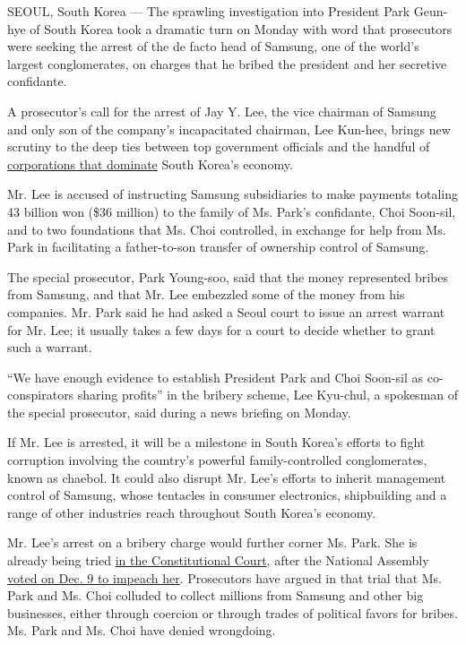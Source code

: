 SEOUL, South Korea --- The sprawling investigation into President Park
Geun-hye of South Korea took a dramatic turn on Monday with word that
prosecutors were seeking the arrest of the de facto head of Samsung, one
of the world's largest conglomerates, on charges that he bribed the
president and her secretive confidante.

A prosecutor's call for the arrest of Jay Y. Lee, the vice chairman of
Samsung and only son of the company's incapacitated chairman, Lee
Kun-hee, brings new scrutiny to the deep ties between top government
officials and the handful of
\href{https://www.nytimes.com/2017/01/02/world/asia/south-korea-park-geun-hye-samsung.html}{corporations
that dominate} South Korea's economy.

Mr. Lee is accused of instructing Samsung subsidiaries to make payments
totaling 43 billion won (\$36 million) to the family of Ms. Park's
confidante, Choi Soon-sil, and to two foundations that Ms. Choi
controlled, in exchange for help from Ms. Park in facilitating a
father-to-son transfer of ownership control of Samsung.

The special prosecutor, Park Young-soo, said that the money represented
bribes from Samsung, and that Mr. Lee embezzled some of the money from
his companies. Mr. Park said he had asked a Seoul court to issue an
arrest warrant for Mr. Lee; it usually takes a few days for a court to
decide whether to grant such a warrant.

``We have enough evidence to establish President Park and Choi Soon-sil
as co-conspirators sharing profits'' in the bribery scheme, Lee
Kyu-chul, a spokesman of the special prosecutor, said during a news
briefing on Monday.

If Mr. Lee is arrested, it will be a milestone in South Korea's efforts
to fight corruption involving the country's powerful family-controlled
conglomerates, known as chaebol. It could also disrupt Mr. Lee's efforts
to inherit management control of Samsung, whose tentacles in consumer
electronics, shipbuilding and a range of other industries reach
throughout South Korea's economy.

Mr. Lee's arrest on a bribery charge would further corner Ms. Park. She
is already being tried
\href{https://www.nytimes.com/2017/01/03/world/asia/south-korea-president-impeachment-trial.html}{in
the Constitutional Court}, after the National Assembly
\href{https://www.nytimes.com/2016/12/09/world/asia/south-korea-president-park-geun-hye-impeached.html}{voted
on Dec. 9 to impeach her}. Prosecutors have argued in that trial that
Ms. Park and Ms. Choi colluded to collect millions from Samsung and
other big businesses, either through coercion or through trades of
political favors for bribes. Ms. Park and Ms. Choi have denied
wrongdoing.

